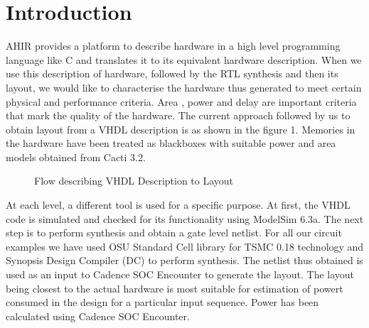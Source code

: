 \documentclass[a4paper, twoside]{article}      %
\begin{document}
\section{Introduction}
{AHIR provides a platform to describe hardware in a high level programming language like C and translates it to its equivalent hardware description. When we use this description of hardware, followed by the RTL synthesis and then its layout, we would like to characterise the hardware thus generated to meet certain physical and performance criteria. Area , power and delay are  important criteria that mark the quality of the hardware. The current approach followed by us to obtain layout from a VHDL description is as shown in the figure 1. Memories in the hardware have been treated as blackboxes with suitable power and area models obtained from Cacti 3.2.  

\begin{figure}[ht]
{\centering {} \par}
\caption{Flow describing VHDL Description to Layout}
\end{figure}

At each level, a different tool is used for a specific purpose. At first,  the VHDL code  is simulated and checked for  its functionality using ModelSim 6.3a. The next step is  to perform synthesis and obtain a gate level netlist. For all our circuit examples we have used  OSU Standard Cell library for TSMC 0.18 technology and Synopsis  Design Compiler (DC) to perform synthesis. The netlist thus obtained is used as an input to Cadence SOC Encounter  to generate the layout. The layout being closest to the actual hardware is most suitable for estimation of powert consumed in the design for a particular input sequence.  Power has been calculated using Cadence SOC Encounter.

}
\end{document}
